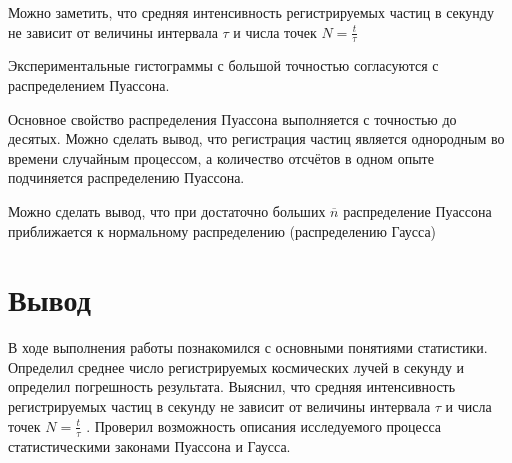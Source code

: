 \documentclass[a4paper, 12pt]{article}
\begin{document}
Можно заметить, что средняя интенсивность регистрируемых частиц в секунду не зависит от величины интервала $\tau$ и числа точек $N=\frac{t}{\tau}$

Экспериментальные гистограммы с большой точностью согласуются с распределением Пуассона.

Основное свойство распределения Пуассона выполняется с точностью до десятых. Можно сделать вывод, что регистрация частиц является однородным во времени случайным процессом, а количество
отсчётов в одном опыте подчиняется распределению Пуассона.

Можно сделать вывод, что при достаточно больших $\overline{n}$ распределение Пуассона приближается к нормальному распределению (распределению Гаусса)

\section*{Вывод}

В ходе выполнения работы познакомился с основными понятиями статистики. Определил среднее число регистрируемых космических лучей в секунду и определил погрешность результата. Выяснил, что средняя интенсивность регистрируемых частиц в секунду не зависит от величины интервала $\tau$ и числа точек $N = \frac{t}{\tau}$ . Проверил возможность описания исследуемого процесса статистическими законами Пуассона и Гаусса.
\end{document}
